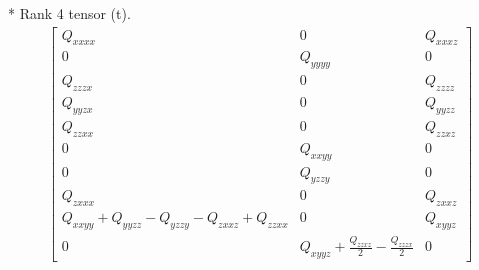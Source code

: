 \documentclass[fleqn,8pt,landscape]{jsarticle}
\begin{document}
* Rank 4 tensor (t).
\begin{align*}
\begin{bmatrix} Q_{xxxx} & 0 & Q_{xxxz} \\ 0 & Q_{yyyy} & 0 \\ Q_{zzzx} & 0 & Q_{zzzz} \\ Q_{yyzx} & 0 & Q_{yyzz} \\ Q_{zzxx} & 0 & Q_{zzxz} \\ 0 & Q_{xxyy} & 0 \\ 0 & Q_{yzzy} & 0 \\ Q_{zxxx} & 0 & Q_{zxxz} \\ Q_{xxyy} + Q_{yyzz} - Q_{yzzy} - Q_{zxxz} + Q_{zzxx} & 0 & Q_{xyyz} \\ 0 & Q_{xyyz} + \frac{Q_{zzxz}}{2} - \frac{Q_{zzzx}}{2} & 0 \end{bmatrix}
\end{align*}
\end{document}
